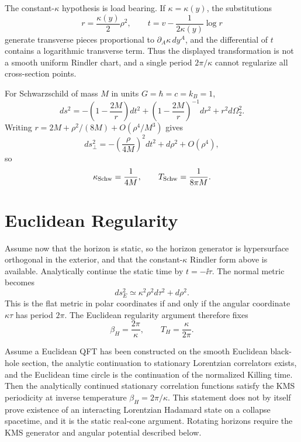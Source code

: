 The constant-\(\kappa\) hypothesis is load bearing.  If
\(\kappa=\kappa(y)\), the substitutions
\[
  r=\frac{\kappa(y)}2\rho^2,
  \qquad
  t=v-\frac{1}{2\kappa(y)}\log r
\]
generate transverse pieces proportional to \(\partial_A\kappa\,dy^A\), and
the differential of \(t\) contains a logarithmic transverse term.  Thus the
displayed transformation is not a smooth uniform Rindler chart, and a single
period \(2\pi/\kappa\) cannot regularize all cross-section points.

For Schwarzschild of mass \(M\) in units \(G=\hbar=c=k_B=1\),
\[
  ds^2= -\left(1-\frac{2M}{r}\right)dt^2
  +\left(1-\frac{2M}{r}\right)^{-1}dr^2+r^2d\Omega_2^2 .
\]
Writing \(r=2M+\rho^2/(8M)+O(\rho^4/M^3)\) gives
\[
  ds^2_{\perp}
  =
  -\left(\frac{\rho}{4M}\right)^2dt^2+d\rho^2+O(\rho^4),
\]
so
\[
  \kappa_{\rm Schw}=\frac1{4M},
  \qquad
  T_{\rm Schw}=\frac1{8\pi M}.
\]

\section{Euclidean Regularity}

Assume now that the horizon is static, so the horizon generator is
hypersurface orthogonal in the exterior, and that the constant-\(\kappa\)
Rindler form above is available.  Analytically continue the static time by
\(t=-\ii\tau\).  The normal metric becomes
\[
  ds_E^2\simeq \kappa^2\rho^2d\tau^2+d\rho^2 .
\]
This is the flat metric in polar coordinates if and only if the angular
coordinate \(\kappa\tau\) has period \(2\pi\).  The Euclidean regularity
argument therefore fixes
\[
  \beta_H=\frac{2\pi}{\kappa},
  \qquad
  T_H=\frac{\kappa}{2\pi}.
\]

\begin{remark}
\label{rem:hawking-euclidean-regularity-scope}
Assume a Euclidean QFT has been constructed on the smooth Euclidean black-hole
section, the analytic continuation to stationary Lorentzian correlators
exists, and the Euclidean time circle is the continuation of the normalized
Killing time.  Then the analytically continued stationary correlation
functions satisfy the KMS periodicity at inverse temperature
\(\beta_H=2\pi/\kappa\).  This statement does not by itself prove existence
of an interacting Lorentzian Hadamard state on a collapse spacetime, and it is
the static real-cone argument.  Rotating horizons require the KMS generator
and angular potential described below.
\end{remark}

